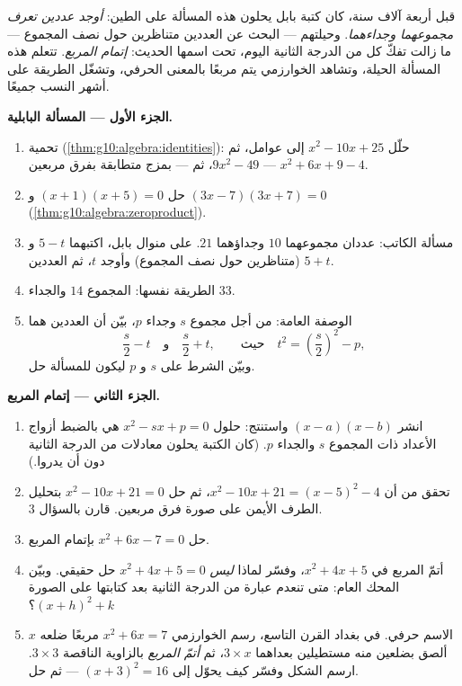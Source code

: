\begin{problem}[{مسألة نهاية الأسبوع --- مسائل المجموع والجداء،
وإتمام المربع كما رسمه الخوارزمي، والمعادلة
$x^2 = x + 1$}]
\label{pb:g10:algebra:1}
قبل أربعة آلاف سنة، كان كتبة بابل يحلون هذه المسألة على الطين:
\emph{أوجد عددين تعرف مجموعهما وجداءهما}. وحيلتهم ---
البحث عن العددين متناظرين حول نصف المجموع --- ما زالت
تفكّ كل  من الدرجة الثانية اليوم، تحت اسمها
الحديث: \emph{إتمام المربع}. تتعلم هذه المسألة الحيلة،
وتشاهد الخوارزمي يتم مربعًا بالمعنى الحرفي،
وتشغّل الطريقة على أشهر النسب جميعًا.

\medskip
\noindent\textbf{الجزء الأول --- المسألة البابلية.}
\begin{enumerate}
  \item تحمية (\cref{thm:g10:algebra:identities}): حلّل
        $x^2 - 10x + 25$ إلى عوامل، ثم $9x^2 - 49$، ثم --- بمزج
        متطابقة بفرق مربعين ---
        $x^2 + 6x + 9 - 4$.
  \item حل $(x + 1)(x + 5) = 0$ و
        $(3x - 7)(3x + 7) = 0$
        (\cref{thm:g10:algebra:zeroproduct}).
  \item مسألة الكاتب: عددان مجموعهما $10$
        وجداؤهما $21$. على منوال بابل، اكتبهما $5 - t$
        و $5 + t$ (متناظرين حول نصف المجموع) وأوجد $t$،
        ثم العددين.
  \item الطريقة نفسها: المجموع $14$ والجداء $33$.
  \item الوصفة العامة: من أجل مجموع $s$ وجداء $p$، بيّن
        أن العددين هما
        \[
        \frac s2 - t
        \quad\text{و}\quad
        \frac s2 + t,
        \qquad\text{حيث}\quad
        t^2 = \left(\frac s2\right)^2 - p ,
        \]
        وبيّن الشرط على $s$ و $p$ ليكون للمسألة
        حل.
\end{enumerate}

\medskip
\noindent\textbf{الجزء الثاني --- إتمام المربع.}
\begin{enumerate}[resume]
  \item انشر $(x - a)(x - b)$ واستنتج: حلول
        $x^2 - sx + p = 0$ هي بالضبط أزواج الأعداد ذات
        المجموع $s$ والجداء $p$. (كان الكتبة يحلون
        معادلات من الدرجة الثانية دون أن يدروا.)
  \item تحقق من أن $x^2 - 10x + 21 = (x - 5)^2 - 4$، ثم حل
        $x^2 - 10x + 21 = 0$ بتحليل الطرف الأيمن على صورة
        فرق مربعين. قارن بالسؤال 3.
  \item حل $x^2 + 6x - 7 = 0$ بإتمام المربع.
  \item أتمّ المربع في $x^2 + 4x + 5$، وفسّر لماذا
        \emph{ليس}  $x^2 + 4x + 5 = 0$ حل
        حقيقي. وبيّن المحك العام: متى تنعدم عبارة من الدرجة
        الثانية بعد كتابتها على الصورة
        $(x + h)^2 + k$؟
  \item الاسم حرفي. في بغداد القرن التاسع،
        رسم الخوارزمي $x^2 + 6x = 7$ مربعًا ضلعه $x$
        ألصق بضلعين منه مستطيلين بعداهما $3 \times x$،
        ثم \emph{أتمّ المربع} بالزاوية الناقصة
        $3 \times 3$. ارسم الشكل وفسّر كيف
        يحوّل  إلى $(x + 3)^2 = 16$ --- ثم حل.
\end{enumerate}


\end{problem}
